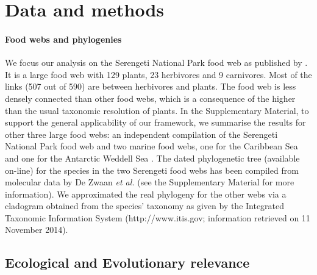\documentclass[12pt]{article}
\begin{document}

\section{Data and methods}

\paragraph{Food webs and phylogenies}
We focus our analysis on the Serengeti National Park food web as published
by \citet{baskerville2011spatial}. It is a large food web with 129
plants, 23 herbivores and 9 carnivores. Most of the links (507 out of 590) are between
herbivores and plants. The food web is less densely connected than other food webs, which is a
consequence of the higher than the usual taxonomic resolution of plants. In the
Supplementary Material, to support the general applicability of our framework, we
summarise the results for other three large food webs:
an independent compilation of the Serengeti National Park food web
\citep{de2011serengeti} and two marine food webs, one for the Caribbean Sea
\citep{opitz1996trophic} and one for the Antarctic Weddell Sea
\citep{jennings2002long}. The dated phylogenetic tree (available on-line) for
the species in the two Serengeti food webs has been compiled from molecular
data by De Zwaan \emph{et al.} \citep{dallariva2015exploring} (see the Supplementary
Material for more information). We approximated the real phylogeny for the
other webs via a cladogram obtained from the species' taxonomy as given by the
Integrated Taxonomic Information System (http://www.itis.gov; information
retrieved on 11 November 2014).

\subsection{Ecological and Evolutionary relevance}
\end{document}
